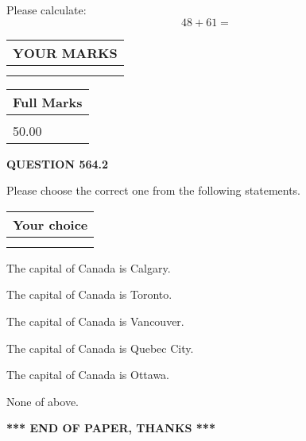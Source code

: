 \documentclass[12pt]{article}
\begin{document}
  
 
Please calculate:
\begin{equation}
48 +  %
61 = \nonumber
\end{equation}
 

 

 
  
\vspace{0.2in}
  
\noindent\begin{tabular}{|l|}
\hline
 YOUR MARKS  \\
\hline
 \\ 
 \\ 
\hline
\end{tabular}
\hspace{0.05in} \begin{tabular}{|l|}
\hline
 Full Marks  \\
\hline
 \\ 
50.00 \\
\hline
\end{tabular}
{\textbf{\Large{QUESTION
564.2 
}}}
  
  
Please choose the correct one from the following statements.
  
  
\noindent\hspace{3.0in} \begin{tabular}{|l|}
\hline
Your choice \\
\hline
 \\ 
 \\ 
\hline
\end{tabular}
  
  
 
 
The capital of Canada is Calgary.
 
 
The capital of Canada is Toronto.
 
 
The capital of Canada is Vancouver.
 
 
The capital of Canada is Quebec City.
 
 
The capital of Canada is Ottawa.
 
 
 None of above.
 
 
   
   
 \vspace{0.2in}
 
   
   
   
   
\vspace{1.0in} 
{\textbf{\large{ *** END OF PAPER, THANKS *** }}} 
   
\end{document}

